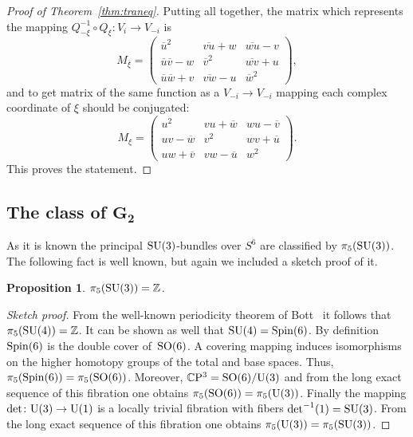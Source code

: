 \documentclass[pdftex]{sigma}
\numberwithin{equation}{section}
\newtheorem{Proposition}[Theorem]{Proposition}
 { \theoremstyle{definition}
\newtheorem{Definition}[Theorem]{Definition}
\newtheorem{Remark}[Theorem]{Remark} }
\newcommand{\SZ}{\mathbb{Z}} %
\newcommand{\SC}{\mathbb{C}} %
\begin{document}
\begin{proof}[Proof of Theorem~\ref{thm:traneq}]
 Putting all together, the matrix which represents the mapping $Q_{-\xi}^{-1}\circ Q_\xi\colon V_i \rightarrow V_{-i}$ is
 \[
 M_{\overline{\xi}}=
 \begin{pmatrix}
 \overline{u}^2 & \overline{vu} +w &\overline{wu} -v\\
 \overline{u}\overline{v}-w & \overline{v}^2 & \overline{wv}+u \\
 \overline{u}\overline{w}+v& \overline{vw}-u & \overline{w}^2
 \end{pmatrix},
 \]
 and to get matrix of the same function as a $V_{-i} \rightarrow V_{-i}$ mapping each complex coordinate of $\xi$ should be conjugated:
 \[
 M_\xi=
 \begin{pmatrix}
 u^2 & vu +\overline{w} &wu-\overline{v}\\
 uv-\overline{w} & v^2 & wv+\overline{u} \\
 uw+\overline{v}& vw-\overline{u} & w^2
 \end{pmatrix}.
 \]
 This proves the statement.
\end{proof}

\subsection[The class of $G_2$]{The class of $\boldsymbol{G_2}$}\label{section3.3}

As it is known the principal ${\rm SU}(3)$-bundles over $S^6$ are classified by $\pi_5({\rm SU}(3))$. The following fact is well known, but again we included a sketch proof of it.
\begin{Proposition} $\pi_5({\rm SU}(3)) =\SZ $.
\end{Proposition}
\begin{proof}[Sketch proof] From the well-known periodicity theorem of Bott~\cite{bott1959stable} it follows that $\pi_5({\rm SU}(4))\allowbreak =\SZ$.
 It can be shown as well that ${\rm SU}(4)={\rm Spin}(6)$. By definition ${\rm Spin}(6)$ is the double cover of~${\rm SO}(6)$. A covering mapping induces isomorphisms on the higher homotopy groups of the total and base spaces. Thus, $\pi_5({\rm Spin}(6))=\pi_5({\rm SO}(6))$. Moreover, $\SC{\rm P}^3={\rm SO}(6)/{\rm U}(3)$ and from the long exact sequence of this fibration one obtains $\pi_5({\rm SO}(6))=\pi_5({\rm U}(3))$. Finally the mapping $\det \colon {\rm U}(3) \rightarrow {\rm U}(1)$ is a locally trivial fibration with fibers $\det^{-1}(1)={\rm SU}(3)$. From the long exact sequence of this fibration one obtains $\pi_5({\rm U}(3))=\pi_5({\rm SU}(3))$.
\end{proof}
\end{document}
